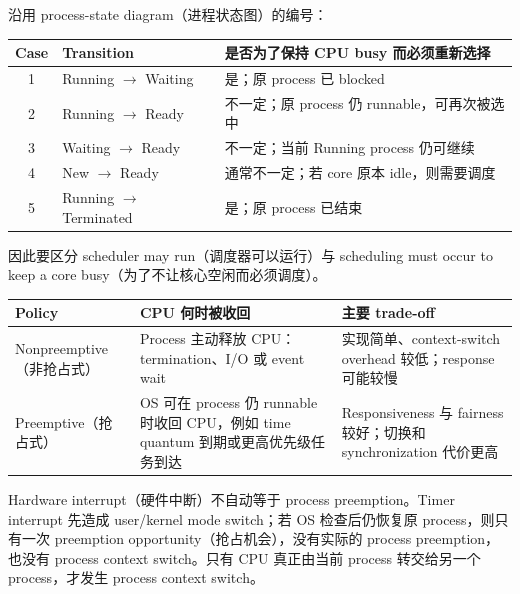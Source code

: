 沿用 process-state diagram（进程状态图）的编号：
\begin{center}
\small
\begin{tabularx}{0.96\textwidth}{@{}c>{\raggedright\arraybackslash}p{4.0cm}X@{}}
  \toprule
  Case & Transition & 是否为了保持 CPU busy 而必须重新选择 \\
  \midrule
  1 & Running $\rightarrow$ Waiting & 是；原 process 已 blocked \\
  2 & Running $\rightarrow$ Ready & 不一定；原 process 仍 runnable，可再次被选中 \\
  3 & Waiting $\rightarrow$ Ready & 不一定；当前 Running process 仍可继续 \\
  4 & New $\rightarrow$ Ready & 通常不一定；若 core 原本 idle，则需要调度 \\
  5 & Running $\rightarrow$ Terminated & 是；原 process 已结束 \\
  \bottomrule
\end{tabularx}
\end{center}

因此要区分 scheduler may run（调度器可以运行）与 scheduling must occur to keep a core busy（为了不让核心空闲而必须调度）。


\begin{center}
\small
\begin{tabularx}{0.96\textwidth}{@{}>{\raggedright\arraybackslash}p{3.2cm}XX@{}}
  \toprule
  Policy & CPU 何时被收回 & 主要 trade-off \\
  \midrule
  Nonpreemptive（非抢占式） & Process 主动释放 CPU：termination、I/O 或 event wait & 实现简单、context-switch overhead 较低；response 可能较慢 \\
  Preemptive（抢占式） & OS 可在 process 仍 runnable 时收回 CPU，例如 time quantum 到期或更高优先级任务到达 & Responsiveness 与 fairness 较好；切换和 synchronization 代价更高 \\
  \bottomrule
\end{tabularx}
\end{center}

Hardware interrupt（硬件中断）不自动等于 process preemption。Timer interrupt 先造成 user/kernel mode switch；若 OS 检查后仍恢复原 process，则只有一次 preemption opportunity（抢占机会），没有实际的 process preemption，也没有 process context switch。只有 CPU 真正由当前 process 转交给另一个 process，才发生 process context switch。


